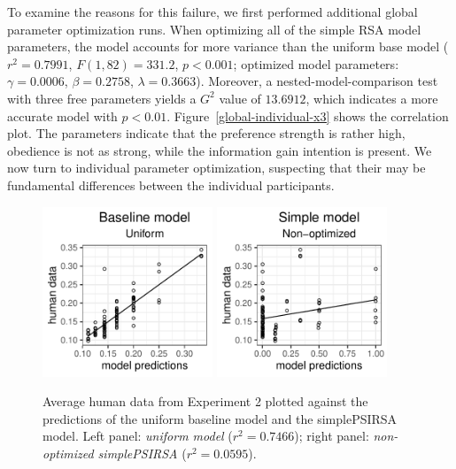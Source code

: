 \documentclass[11pt,a4paper]{article}
\begin{document}
To examine the reasons for this failure, we first performed additional global parameter optimization runs.
When optimizing all of the simple RSA model parameters, the model accounts for more variance than the uniform base model ($r^2=0.7991$, $F(1,82) = 331.2$, $p<0.001$; optimized model parameters: $\gamma=0.0006$, $\beta=0.2758$, $\lambda=0.3663$).
Moreover, a nested-model-comparison test with three free parameters yields a $G^2$ value of $13.6912$, which indicates a more accurate model with $p<0.01$. 
Figure~\ref{global-individual-x3} shows the correlation plot. 
The parameters indicate that the preference strength is rather high, obedience is not as strong, while the information gain intention is present. 
We now turn to individual parameter optimization, suspecting that their may be fundamental differences between the individual participants. 




\begin{figure}[ht]
	\centering
	\includegraphics[width=2in]{images/x3_m20.pdf}
	\includegraphics[width=2in]{images/x3_m7.pdf}
	\caption{Average human data from Experiment 2 plotted against the predictions of the uniform baseline model and the simplePSIRSA model. 
		Left panel: \emph{uniform model} ($r^{2}=0.7466$);
		right panel: \emph{non-optimized simplePSIRSA} ($r^2=0.0595$).
	}
	\label{base-nonopt-x3}
\end{figure}
\end{document}
